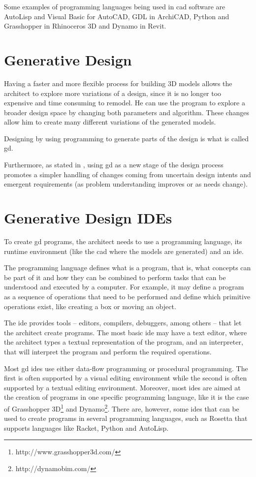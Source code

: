 Some examples of programming languages being used in \gls{cad} software are AutoLisp and Visual Basic for AutoCAD, GDL in ArchiCAD, Python and Grasshopper in Rhinoceros 3D and Dynamo in Revit.


\section{Generative Design}
Having a faster and more flexible process for building 3D models allows the architect to explore more variations of a design, since it is no longer too expensive and time consuming to remodel.
He can use the program to explore a broader design space by changing both parameters and algorithm.
These changes allow him to create many different variations of the generated models.

Designing by using programming to generate parts of the design is what is called \gls{gd}.

Furthermore, as stated in \cite{leitao2014pushing}, using \gls{gd} as a new stage of the design process promotes a simpler handling of changes coming from uncertain design intents and emergent requirements (as problem understanding improves or as needs change).



\section{Generative Design IDEs}
To create \gls{gd} programs, the architect needs to use a programming language, its runtime environment (like the \gls{cad} where the models are generated) and an \gls{ide}.

The programming language defines what is a program, that is, what concepts can be part of it and how they can be combined to perform tasks that can be understood and executed by a computer.
For example, it may define a program as a sequence of operations that need to be performed and define which primitive operations exist, like creating a box or moving an object.

The \gls{ide} provides tools -- editors, compilers, debuggers, among others -- that let the architect create programs.
The most basic \gls{ide} may have a text editor, where the architect types a textual representation of the program, and an interpreter, that will interpret the program and perform the required operations.

Most \gls{gd} \glspl{ide} use either data-flow programming or procedural programming.
The first is often supported by a visual editing environment while the second is often supported by a textual editing environment.
Moreover, most \glspl{ide} are aimed at the creation of programs in one specific programming language, like it is the case of Grasshopper 3D\footnote{http://www.grasshopper3d.com/} and Dynamo\footnote{http://dynamobim.com/}.
There are, however, some \glspl{ide} that can be used to create programs in several programming languages, such as Rosetta\cite{de2012modern} that supports languages like Racket, Python and AutoLisp.

